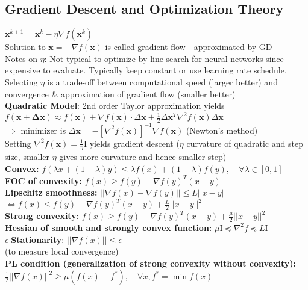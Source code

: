 \subsection*{Gradient Descent and Optimization Theory}
$\mathbf x^{k+1}=\mathbf x^k-\eta\nabla f(\mathbf x^k)$\\
Solution to $\dot{\mathbf x}=-\nabla f(\mathbf x)$ is called gradient flow - approximated by GD\\
Notes on $\eta$: Not typical to optimize by line search for neural networks since expensive to evaluate. Typically keep constant or use learning rate schedule. Selecting $\eta$ is a trade-off between computational speed (larger better) and convergence \& approximation of gradient flow (smaller better)\\
\textbf{Quadratic Model}: 2nd order Taylor approximation yields\\
$f(\mathbf{x+\Delta x})\approx f(\mathbf x)+\nabla f(\mathbf x)\cdot\Delta\mathbf x+\frac{1}{2}\Delta\mathbf x^T\nabla^2f(\mathbf x)\Delta\mathbf x$\\
$\Rightarrow$ minimizer is $\Delta\mathbf x=-[\nabla^2f(\mathbf x)]^{-1}\nabla f(\mathbf x)$ (Newton's method)\\
Setting $\nabla^2 f(\mathbf x)=\frac{1}{\eta}\mathrm I$ yields gradient descent ($\eta$ curvature of quadratic and step size, smaller $\eta$ gives more curvature and hence smaller step)\\
\textbf{Convex:} $f(\lambda x +(1-\lambda)y)\leq \lambda f(x)+(1-\lambda)f(y), \quad \forall\lambda\in[0,1]$\\
\textbf{FOC of convexity:} $f(x)\geq f(y)+\nabla f(y)^T(x-y)$\\
\textbf{Lipschitz smoothness:} $||\nabla f(x)-\nabla f(y)||\leq L||x-y||$\\
$\Leftrightarrow f(x)\leq f(y)+\nabla f(y)^T(x-y)+\frac{L}{2}||x-y||^2$\\
\textbf{Strong convexity:} $f(x)\geq f(y)+\nabla f(y)^T(x-y)+\frac{\mu}{2}||x-y||^2$\\
\textbf{Hessian of smooth and strongly convex function:} $\mu\mathrm I\preccurlyeq\nabla^2 f\preccurlyeq L\mathrm I$\\
$\epsilon$-\textbf{Stationarity}: $||\nabla f(x)||\leq\epsilon$\\ (to measure local convergence)\\
\textbf{PL condition (generalization of strong convexity without convexity):}\\
$\frac{1}{2}||\nabla f(x)||^2\geq\mu(f(x)-f^*),\quad \forall x, f^*=\min f(x)$

